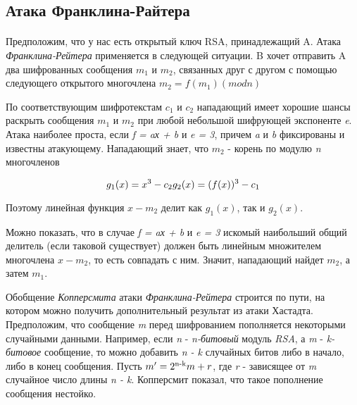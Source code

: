 \subsection{Атака Франклина-Райтера}

\paragraph{} Предположим, что у нас есть открытый ключ RSA, принадлежащий A. Атака \textit{Франклина-Рейтера} применяется в следующей ситуации. B хочет отправить A два шифрованных 
  сообщения \textit{{$m_1$}} и \textit{{$m_2$}}, связанных друг с другом с помощью следующего открытого многочлена \textit{{$ m_2 = f(m_1)(mod n) $}}
  
  По соответствующим шифротекстам \textit{{$c_1$}} и \textit{{$c_2$}} нападающий имеет хорошие шансы раскрыть сообщения \textit{{$m_1$}} и \textit{{$m_2$}} при любой небольшой
  шифрующей экспоненте \textit{e}. Атака наиболее проста, если \textit{f = aх + b} и \textit{e = 3}, причем \textit{a} и \textit{b} фиксированы и известны атакующему. 
  Нападающий знает, что \textit{{$m_2$}} - корень по модулю \textit{n} многочленов
  
    \begin{equation}
      \textit{{$ g_1(x) = x^3 - c_2 g_2(x) = (f(x))^3 - c_1 $}}
    \end{equation}

  Поэтому линейная функция $x - m_{2}$ делит как $ g_1(x) $, так и $ g_2(x) $.
  
  Можно показать, что в случае \textit{f = aх + b} и \textit{e = 3} искомый наибольший общий делитель (если таковой существует) должен быть линейным множителем 
  многочлена \textit{{$x - m_2$}}, то есть совпадать с ним. Значит, нападающий найдет \textit{{$m_2$}}, а затем \textit{{$m_1$}}.
  
  Обобщение \textit{Копперсмита} атаки \textit{Франклина-Рейтера} строится по пути, на котором можно получить дополнительный результат из атаки Хастадта. Предположим, что сообщение \textit{m} 
  перед шифрованием пополняется некоторыми случайными данными. Например, если \textit{n} - \textit{n-битовый} модуль \textit{RSA}, а \textit{m} - \textit{k-битовое} сообщение, 
  то можно добавить \textit{n - k} случайных битов либо в начало, либо в конец сообщения. Пусть \textit{{$ m' = 2\textsuperscript{n-k}m + r $}}, где \textit{r} - зависящее от 
  \textit{m} случайное число длины \textit{n - k}. Копперсмит показал, что такое пополнение сообщения нестойко.
  
